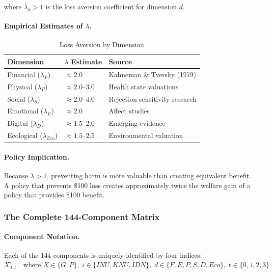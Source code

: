where $\lambda_d > 1$ is the loss aversion coefficient for dimension $d$.

\paragraph{Empirical Estimates of $\lambda$.}

\begin{table}[htbp]
\centering
\caption{Loss Aversion by Dimension}
\label{tab:loss-aversion}
\renewcommand{\arraystretch}{1.3}
\begin{tabular}{@{}lll@{}}
\toprule
\textbf{Dimension} & \textbf{$\lambda$ Estimate} & \textbf{Source} \\
\midrule
Financial ($\lambda_F$) & $\approx 2.0$ & Kahneman \& Tversky (1979) \\
Physical ($\lambda_P$) & $\approx 2.0$--$3.0$ & Health state valuations \\
Social ($\lambda_S$) & $\approx 2.0$--$4.0$ & Rejection sensitivity research \\
Emotional ($\lambda_E$) & $\approx 2.0$ & Affect studies \\
Digital ($\lambda_D$) & $\approx 1.5$--$2.0$ & Emerging evidence \\
Ecological ($\lambda_{Eco}$) & $\approx 1.5$--$2.5$ & Environmental valuation \\
\bottomrule
\end{tabular}
\end{table}

\paragraph{Policy Implication.}
Because $\lambda > 1$, preventing harm is more valuable than creating 
equivalent benefit. A policy that prevents \$100 loss creates approximately
twice the welfare gain of a policy that provides \$100 benefit.

\subsubsection{The Complete 144-Component Matrix}

\paragraph{Component Notation.}
Each of the 144 components is uniquely identified by four indices:
\begin{equation}
X^i_{d,t} \quad \text{where } X \in \{G, P\}, \; i \in \{INU, KNU, IDN\}, \; d \in \{F,E,P,S,D,Eco\}, \; t \in \{0,1,2,3\}
\end{equation}

